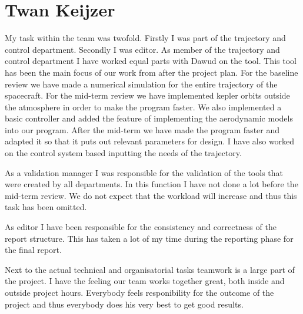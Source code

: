 \section{Twan Keijzer}

My task within the team was twofold. Firstly I was part of the trajectory and control department. Secondly I was editor. As member of the trajectory and control department I have worked equal parts with Dawud on the tool. This tool has been the main focus of our work from after the project plan. For the baseline review we have made a numerical simulation for the entire trajectory of the spacecraft. For the mid-term review we have implemented kepler orbits outside the atmosphere in order to make the program faster. We also implemented a basic controller and added the feature of implementing the aerodynamic models into our program. After the mid-term we have made the program faster and adapted it so that it puts out relevant parameters for design. I have also worked on the control system based inputting the needs of the trajectory.

As a validation manager I was responsible for the validation of the tools that were created by all departments. In this function I have not done a lot before the mid-term review. We do not expect that the workload will increase and thus this task has been omitted.

As editor I have been responsible for the consistency and correctness of the report structure. This has taken a lot of my time during the reporting phase for the final report.

Next to the actual technical and organisatorial tasks teamwork is a large part of the project. I have the feeling our team works together great, both inside and outside project hours. Everybody feels responibility for the outcome of the project and thus everybody does his very best to get good results.